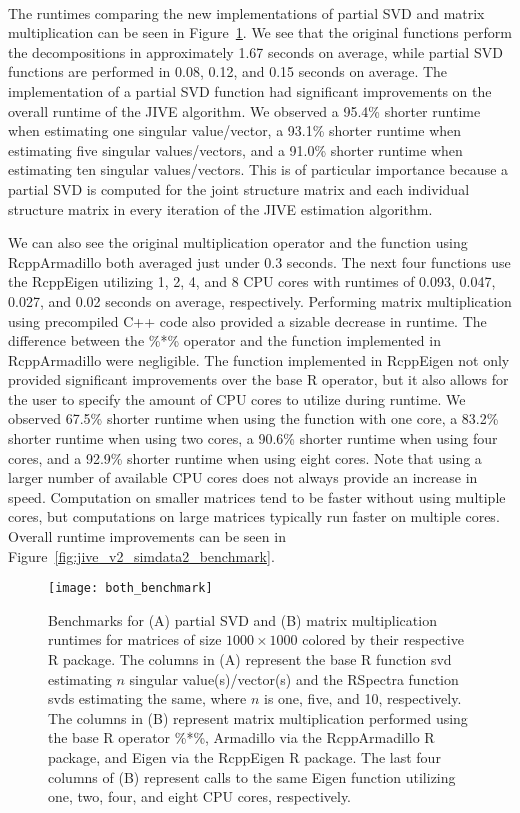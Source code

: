 \documentclass[
12pt, %
letterpaper, %
oneside, %
headinclude,footinclude, %
BCOR5mm, %
]{scrartcl}
\begin{document}
\paragraph*{}
The runtimes comparing the new implementations of partial SVD and matrix multiplication can be seen in Figure~\ref{fig:both_benchmark}. We see that the original functions perform the decompositions in approximately 1.67 seconds on average, while partial SVD functions are performed in 0.08, 0.12, and 0.15 seconds on average. The implementation of a partial SVD function had significant improvements on the overall runtime of the JIVE algorithm. We observed a 95.4\% shorter runtime when estimating one singular value/vector, a 93.1\% shorter runtime when estimating five singular values/vectors, and a 91.0\% shorter runtime when estimating ten singular values/vectors. This is of particular importance because a partial SVD is computed for the joint structure matrix and each individual structure matrix in every iteration of the JIVE estimation algorithm.

We can also see the original multiplication operator and the function using RcppArmadillo both averaged just under 0.3 seconds. The next four functions use the RcppEigen utilizing 1, 2, 4, and 8 CPU cores with runtimes of 0.093, 0.047, 0.027, and 0.02 seconds on average, respectively. Performing matrix multiplication using precompiled C++ code also provided a sizable decrease in runtime. The difference between the \%*\% operator and the function implemented in RcppArmadillo were negligible. The function implemented in RcppEigen not only provided significant improvements over the base R operator, but it also allows for the user to specify the amount of CPU cores to utilize during runtime. We observed 67.5\% shorter runtime when using the function with one core, a 83.2\% shorter runtime when using two cores, a 90.6\% shorter runtime when using four cores, and a 92.9\% shorter runtime when using eight cores. Note that using a larger number of available CPU cores does not always provide an increase in speed. Computation on smaller matrices tend to be faster without using multiple cores, but computations on large matrices typically run faster on multiple cores. Overall runtime improvements can be seen in Figure~\ref{fig:jive_v2_simdata2_benchmark}.

\begin{figure}[H]
    \centering 
    \texttt{[image: both\_benchmark]} 
    \caption[Benchmark for Partial SVD and Matrix Multiplication Runtimes.]{Benchmarks for (A) partial SVD and (B) matrix multiplication runtimes for matrices of size $1000 \times 1000$ colored by their respective R package. The columns in (A) represent the base R function svd estimating $n$ singular value(s)/vector(s) and the RSpectra function svds estimating the same, where $n$ is one, five, and 10, respectively. The columns in (B) represent matrix multiplication performed using the base R operator \%*\%, Armadillo via the RcppArmadillo R package, and Eigen via the RcppEigen R package. The last four columns of (B) represent calls to the same Eigen function utilizing one, two, four, and eight CPU cores, respectively.}
    \label{fig:both_benchmark} 
\end{figure}
\end{document}

